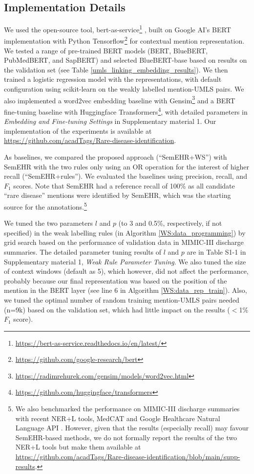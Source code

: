 \documentclass[twocolumn]{bmcart}
\begin{document}
\subsection*{Implementation Details}
We used the open-source tool, bert-as-service\footnote{\url{https://bert-as-service.readthedocs.io/en/latest/}} \cite{xiao2019bertservice}, built on Google AI's BERT implementation with Python Tensorflow\footnote{\url{https://github.com/google-research/bert}} \cite{devlin-etal-2019-bert} for contextual mention representation. We tested a range of pre-trained BERT models (BERT, BlueBERT, PubMedBERT, and SapBERT) and selected BlueBERT-base \cite{peng2019transfer} based on results on the validation set (see Table \ref{umls_linking_embedding_results}). We then trained a logistic regression model with the representations, with default configuration using scikit-learn \cite{scikit-learn} on the weakly labelled mention-UMLS pairs. We also implemented a word2vec embedding baseline with Gensim\footnote{\url{https://radimrehurek.com/gensim/models/word2vec.html}} and a BERT fine-tuning baseline with Huggingface Transformers\footnote{\url{https://github.com/huggingface/transformers}}, with detailed parameters in \textit{Embedding and Fine-tuning Settings} in Supplementary material 1. Our implementation of the experiments is available at \url{https://github.com/acadTags/Rare-disease-identification}.

As baselines, we compared the proposed approach (``SemEHR+WS'') with SemEHR with the two rules only using an OR operation for the interest of higher recall (``SemEHR+rules''). We evaluated the baselines using precision, recall, and $F_1$ scores. Note that SemEHR had a reference recall of 100\% as all candidate ``rare disease'' mentions were identified by SemEHR, which was the starting source for the annotations.\footnote{We also benchmarked the performance on MIMIC-III discharge summaries with recent NER+L tools, MedCAT \cite{Kraljevic2021} and Google Healthcare Natural Language API \cite{Bodnari2020}. However, given that the results (especially recall) may favour SemEHR-based methods, we do not formally report the results of the two NER+L tools but make them available at \url{https://github.com/acadTags/Rare-disease-identification/blob/main/supp-results}.}

We tuned the two parameters $l$ and $p$ (to 3 and 0.5\%, respectively, if not specified) in the weak labelling rules (in Algorithm \ref{WS:data_programming}) by grid search based on the performance of validation data in MIMIC-III discharge summaries. The detailed parameter tuning results of $l$ and $p$ are in Table S1-1 in Supplementary material 1, \textit{Weak Rule Parameter Tuning}. We also tuned the size of context windows (default as 5), which however, did not affect the performance, probably because our final representation was based on the position of the mention in the BERT layer (see line 6 in Algorithm \ref{WS:data_rep_train}). Also, we tuned the optimal number of random training mention-UMLS pairs needed (n=9k) based on the validation set, which had little impact on the results ($<$1\% $F_1$ score).
\end{document}
